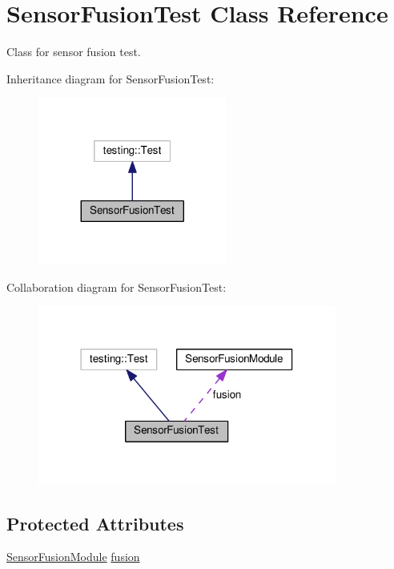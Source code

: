 \hypertarget{class_sensor_fusion_test}{}\section{Sensor\+Fusion\+Test Class Reference}
\label{class_sensor_fusion_test}


Class for sensor fusion test.  




Inheritance diagram for Sensor\+Fusion\+Test\+:
\nopagebreak
\begin{figure}[H]
\begin{center}
\leavevmode
\includegraphics[width=176pt]{class_sensor_fusion_test__inherit__graph}
\end{center}
\end{figure}


Collaboration diagram for Sensor\+Fusion\+Test\+:
\nopagebreak
\begin{figure}[H]
\begin{center}
\leavevmode
\includegraphics[width=278pt]{class_sensor_fusion_test__coll__graph}
\end{center}
\end{figure}
\subsection*{Protected Attributes}
\begin{DoxyCompactItemize}
\item 
\hyperlink{class_sensor_fusion_module}{Sensor\+Fusion\+Module} \hyperlink{class_sensor_fusion_test_a2f23e29ade2dcdec5510cc2b893c9cc7}{fusion}
\end{DoxyCompactItemize}


